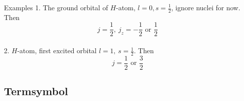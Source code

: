 \documentclass[UTF8,12pt]{article} %
\begin{document}
\begin{myboxes}{Examples}{}
1. The ground orbital of $H$-atom, $l=0, s=\frac{1}{2}$, ignore nuclei for now. Then
$$j = \frac{1}{2},~ j_{z} = -\frac{1}{2} \text{ or } \frac{1}{2}$$\\
2. $H$-atom, first excited orbital $l=1,~ s=\frac{1}{2}$. Then
$$j = \frac{1}{2} \text{ or } \frac{3}{2}$$
\end{myboxes}

\subsection{Termsymbol}
\end{document}
